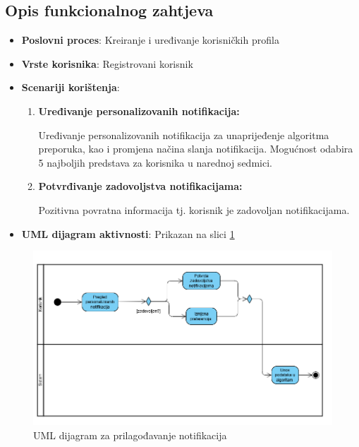 \subsection{Opis funkcionalnog zahtjeva}  
\begin{itemize}  
    \item \textbf{Poslovni proces}: Kreiranje i uređivanje korisničkih profila  
    \item \textbf{Vrste korisnika}: Registrovani korisnik
    \item \textbf{Scenariji korištenja}:  
        \begin{enumerate}  
            \item \textbf{Uređivanje personalizovanih notifikacija:} 

		Uređivanje personalizovanih notifikacija za unaprijeđenje algoritma preporuka, kao i promjena načina slanja notifikacija. Mogućnost odabira 5 najboljih predstava za korisnika u narednoj sedmici. 
            \item \textbf{Potvrđivanje zadovoljstva notifikacijama:} 

	Pozitivna povratna informacija tj. korisnik je zadovoljan notifikacijama.    
        \end{enumerate}  
    \item \textbf{UML dijagram aktivnosti}: Prikazan na slici \ref{fig:fz8}  
\end{itemize}  
\begin{figure}[H]
        \centering
        \includegraphics[width=1\linewidth]{Slike/FZ8.png}
        \caption{UML dijagram za prilagođavanje notifikacija}
        \label{fig:fz8}
    \end{figure}
\sloppy  
